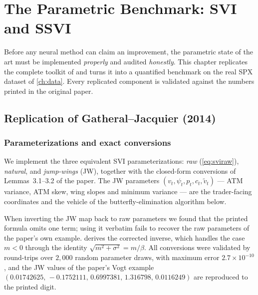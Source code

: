 \chapter{The Parametric Benchmark: SVI and SSVI}
\label{ch:parametric}

Before any neural method can claim an improvement, the parametric state of the
art must be implemented \emph{properly} and audited \emph{honestly}. This
chapter replicates the complete toolkit of \cite{gatheral2014arbitrage} and
turns it into a quantified benchmark on the real SPX dataset of
\cref{ch:data}. Every replicated component is validated against the numbers
printed in the original paper.

\section{Replication of Gatheral--Jacquier (2014)}
\label{sec:replication}

\subsection{Parameterizations and exact conversions}
We implement the three equivalent SVI parameterizations: \emph{raw}
(\cref{eq:sviraw}), \emph{natural}, and \emph{jump-wings} (JW), together with
the closed-form conversions of Lemmas~3.1--3.2 of the paper. The JW
parameters $(v_t,\psi_t,p_t,c_t,\tilde v_t)$ --- ATM variance, ATM skew, wing
slopes and minimum variance --- are the trader-facing coordinates and the
vehicle of the butterfly-elimination algorithm below.

\begin{remark}
\label{rem:lemma32}
When inverting the JW map back to raw parameters we found that the printed
formula omits one term; using it verbatim fails to recover the raw parameters
of the paper's own example.  derives the corrected inverse,
which handles the case $m<0$ through the identity
$\sqrt{m^2+\sigma^2}=m/\beta$. All conversions were validated by round-trips
over $2{,}000$ random parameter draws, with maximum error
$2.7\times10^{-10}$, and the JW values of the paper's Vogt example
$(0.01742625,\,-0.1752111,\,0.6997381,\,1.316798,\,0.0116249)$ are reproduced
to the printed digit.
\end{remark}

